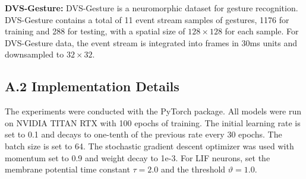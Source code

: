 \documentclass[letterpaper]{article} %
\begin{document}
\textbf{DVS-Gesture:} DVS-Gesture \cite{DVS-Gesture} is a neuromorphic dataset for gesture recognition. DVS-Gesture contains a total of 11 event stream samples of gestures, 1176 for training and 288 for testing, with a spatial size of $128 \times 128$ for each sample. For DVS-Gesture data, the event stream is integrated into frames in 30ms units and downsampled to $32 \times 32$.

\subsection{A.2 Implementation Details}
The experiments were conducted with the PyTorch package. All models were run on NVIDIA TITAN RTX with 100 epochs of training. The initial learning rate is set to 0.1 and decays to one-tenth of the previous rate every 30 epochs. The batch size is set to 64. The stochastic gradient descent optimizer was used with momentum set to 0.9 and weight decay to 1e-3. For LIF neurons, set the membrane potential time constant $\tau = 2.0$ and the threshold $\vartheta = 1.0$.  
\end{document}
